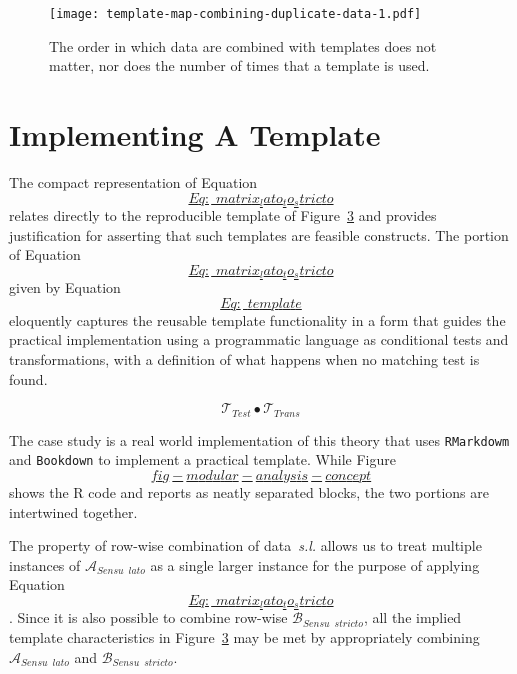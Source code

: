 \documentclass[
]{article}
\begin{document}
\begin{figure}
\hypertarget{fig:template-map-combining-duplicate-data-1}{%
\centering
\texttt{[image: template-map-combining-duplicate-data-1.pdf]}
\caption{The order in which data are combined with templates does not
matter, nor does the number of times that a template is
used.}\label{fig:template-map-combining-duplicate-data-1}
}
\end{figure}

\hypertarget{sec:implementation}{%
\section{Implementing A Template}\label{sec:implementation}}

The compact representation of
Equation~\protect\hyperlink{Eq:_matrix_lato_to_stricto}{\[Eq:\_matrix_lato_to_stricto\]}
relates directly to the reproducible template of
Figure~\protect\hyperlink{fig_essential_template}{3} and provides
justification for asserting that such templates are feasible constructs.
The portion of
Equation~\protect\hyperlink{Eq:_matrix_lato_to_stricto}{\[Eq:\_matrix_lato_to_stricto\]}
given by Equation~\protect\hyperlink{Eq:_template}{\[Eq:\_template\]}
eloquently captures the reusable template functionality in a form that
guides the practical implementation using a programmatic language as
conditional tests and transformations, with a definition of what happens
when no matching test is found.

\[\label{Eq:_template}
    \mathscr{T}_{Test} \bullet \mathscr{T}_{Trans}\]

The case study is a real world implementation of this theory that uses
\texttt{RMarkdowm} and \texttt{Bookdown} to implement a practical
template. While
Figure~\protect\hyperlink{fig-modular-analysis-concept}{\[fig-modular-analysis-concept\]}
shows the R code and reports as neatly separated blocks, the two
portions are intertwined together.

The property of row-wise combination of data~\emph{s.l.} allows us to
treat multiple instances of \(\mathscr{A}_{Sensu \enspace lato}\) as a
single larger instance for the purpose of applying
Equation~\protect\hyperlink{Eq:_matrix_lato_to_stricto}{\[Eq:\_matrix_lato_to_stricto\]}.
Since it is also possible to combine row-wise
\(\mathscr{B}_{Sensu \enspace stricto}\), all the implied template
characteristics in Figure~\protect\hyperlink{fig_essential_template}{3}
may be met by appropriately combining
\(\mathscr{A}_{Sensu \enspace lato}\) and
\(\mathscr{B}_{Sensu \enspace stricto}\).
\end{document}

